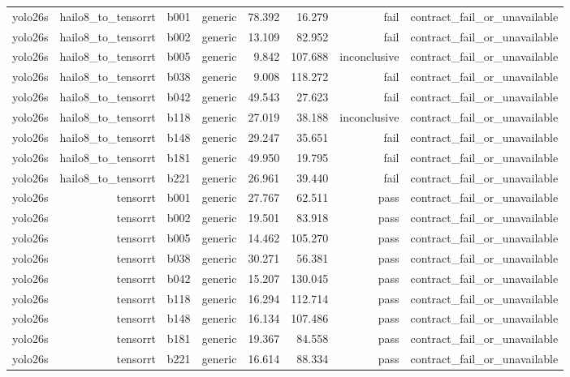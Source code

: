 \begin{table}[t]
\begin{tabular}{lrrrrrrr}
yolo26s & hailo8\_to\_tensorrt & b001 & generic & 78.392 & 16.279 & fail & contract\_fail\_or\_unavailable \\
yolo26s & hailo8\_to\_tensorrt & b002 & generic & 13.109 & 82.952 & fail & contract\_fail\_or\_unavailable \\
yolo26s & hailo8\_to\_tensorrt & b005 & generic & 9.842 & 107.688 & inconclusive & contract\_fail\_or\_unavailable \\
yolo26s & hailo8\_to\_tensorrt & b038 & generic & 9.008 & 118.272 & fail & contract\_fail\_or\_unavailable \\
yolo26s & hailo8\_to\_tensorrt & b042 & generic & 49.543 & 27.623 & fail & contract\_fail\_or\_unavailable \\
yolo26s & hailo8\_to\_tensorrt & b118 & generic & 27.019 & 38.188 & inconclusive & contract\_fail\_or\_unavailable \\
yolo26s & hailo8\_to\_tensorrt & b148 & generic & 29.247 & 35.651 & fail & contract\_fail\_or\_unavailable \\
yolo26s & hailo8\_to\_tensorrt & b181 & generic & 49.950 & 19.795 & fail & contract\_fail\_or\_unavailable \\
yolo26s & hailo8\_to\_tensorrt & b221 & generic & 26.961 & 39.440 & fail & contract\_fail\_or\_unavailable \\
yolo26s & tensorrt & b001 & generic & 27.767 & 62.511 & pass & contract\_fail\_or\_unavailable \\
yolo26s & tensorrt & b002 & generic & 19.501 & 83.918 & pass & contract\_fail\_or\_unavailable \\
yolo26s & tensorrt & b005 & generic & 14.462 & 105.270 & pass & contract\_fail\_or\_unavailable \\
yolo26s & tensorrt & b038 & generic & 30.271 & 56.381 & pass & contract\_fail\_or\_unavailable \\
yolo26s & tensorrt & b042 & generic & 15.207 & 130.045 & pass & contract\_fail\_or\_unavailable \\
yolo26s & tensorrt & b118 & generic & 16.294 & 112.714 & pass & contract\_fail\_or\_unavailable \\
yolo26s & tensorrt & b148 & generic & 16.134 & 107.486 & pass & contract\_fail\_or\_unavailable \\
yolo26s & tensorrt & b181 & generic & 19.367 & 84.558 & pass & contract\_fail\_or\_unavailable \\
yolo26s & tensorrt & b221 & generic & 16.614 & 88.334 & pass & contract\_fail\_or\_unavailable \\

\end{tabular}
\end{table}
